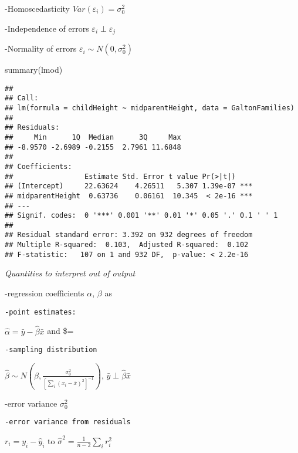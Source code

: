 \documentclass[
]{article}
\newenvironment{Shaded}{\begin{snugshade}}{\end{snugshade}}
\newcommand{\FunctionTok}[1]{\textcolor[rgb]{0.00,0.00,0.00}{#1}}
\newcommand{\NormalTok}[1]{#1}
\begin{document}
-Homoscedasticity \(Var(\varepsilon_i)=\sigma_0^2\)

-Independence of errors \(\varepsilon_i\perp\varepsilon_j\)

-Normality of errors \(\varepsilon_i\sim N(0,\sigma_0^2)\)

\begin{Shaded}
\begin{Highlighting}[]
\FunctionTok{summary}\NormalTok{(lmod)}
\end{Highlighting}
\end{Shaded}

\begin{verbatim}
## 
## Call:
## lm(formula = childHeight ~ midparentHeight, data = GaltonFamilies)
## 
## Residuals:
##     Min      1Q  Median      3Q     Max 
## -8.9570 -2.6989 -0.2155  2.7961 11.6848 
## 
## Coefficients:
##                 Estimate Std. Error t value Pr(>|t|)    
## (Intercept)     22.63624    4.26511   5.307 1.39e-07 ***
## midparentHeight  0.63736    0.06161  10.345  < 2e-16 ***
## ---
## Signif. codes:  0 '***' 0.001 '**' 0.01 '*' 0.05 '.' 0.1 ' ' 1
## 
## Residual standard error: 3.392 on 932 degrees of freedom
## Multiple R-squared:  0.103,  Adjusted R-squared:  0.102 
## F-statistic:   107 on 1 and 932 DF,  p-value: < 2.2e-16
\end{verbatim}

\emph{Quantities to interpret out of output}

-regression coefficients \(\alpha\), \(\beta\) as

\begin{verbatim}
-point estimates:
\end{verbatim}

\(\hat{\alpha}=\bar{y}-\hat{\beta}\bar{x}\) and
\$\hat{\beta}=

\begin{verbatim}
-sampling distribution 
\end{verbatim}

\(\hat{\beta}\sim N(\beta,\frac{\sigma_0^2}{[\sum_i (x_i-\bar{x})^2]^{-1}})\),
\(\bar{y}\perp\hat{\beta}\bar{x}\)

-error variance \(\sigma_0^2\)

\begin{verbatim}
-error variance from residuals 
\end{verbatim}

\(r_i=y_i-\hat{y}_i\) to \(\hat{\sigma}^2=\frac{1}{n-2}\sum_i r_i^2\)
\end{document}
